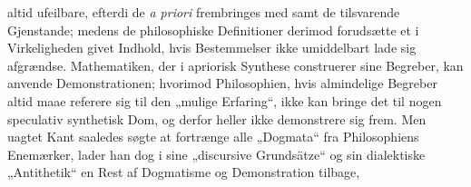 \documentclass[12pt]{book}
\newcommand{\opage}[1]{\marginnote{\footnotesize\textit{[#1]}}}
\begin{document}
altid ufeilbare, efterdi de \textit{a priori} frembringes med samt de tilsvarende
Gjenstande; medens de philosophiske Definitioner derimod forudsætte et i
Virkeligheden givet Indhold, hvis Bestemmelser ikke umiddelbart lade sig afgrændse.
Mathematiken, der i apriorisk Synthese construerer sine Begreber, kan anvende
Demonstrationen; hvorimod Philosophien, hvis almindelige Begreber altid maae referere
sig til den „mulige Erfaring“, ikke kan bringe det til nogen speculativ synthetisk
\opage{92} %
%
%
Dom, og derfor heller ikke demonstrere sig frem. Men uagtet Kant saaledes søgte at
fortrænge alle „Dogmata“ fra Philosophiens Enemærker, lader han dog i sine
„discursive Grundsätze“ og sin dialektiske „Antithetik“ en Rest af Dogmatisme og
Demonstration tilbage,
\end{document}
